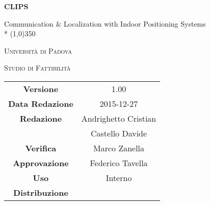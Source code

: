 \documentclass[a4paper,12pt]{article}
\author{Andrighetto Cristian, Castello Davide}
\date{27/12/2015}
\begin{document}
	\begin{titlepage}
		\centering
		{\huge\bfseries CLIPS\par}
		Communication \& Localization with Indoor Positioning Systems \\*
		\line(1,0){350} \\
		{\scshape\LARGE Università di Padova \par}
		\vspace{1cm}
		{\scshape\Large Studio di Fattibilità \par}
		\logo
		\newpage
		\begin{tabular}{c|c}
			{\hfill \textbf{Versione}} 			& 1.00			\\
			{\hfill\textbf{Data Redazione}} 		& 2015-12-27  		\\ 
			{\hfill\textbf{Redazione}} 			&  Andrighetto Cristian \\ 
			& Castello Davide       \\
			{\hfill\textbf{Verifica}} 				&  Marco Zanella   \\
			{\hfill\textbf{Approvazione}} 		& Federico Tavella \\
			{\hfill\textbf{Uso}} 					& Interno			\\
			{\hfill\textbf{Distribuzione}} 			& \leaf			\\
		\end{tabular}
    \end{titlepage}
	
	\newpage
		\pagestyle{myfront}
		
	
	\newpage
		\tableofcontents
	
	\label{LastFrontPage}
	
	\newpage
	\pagestyle{mymain}
		
	\newpage
		
	\newpage
		
	\newpage
		
\label{LastPage}
\end{document}
